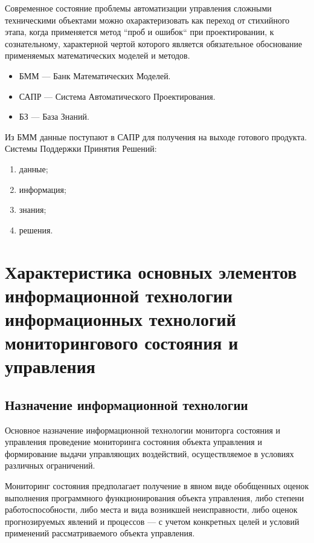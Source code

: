\documentclass[a4paper,12pt]{report}
\begin{document}
	Современное состояние проблемы автоматизации управления сложными техническими
	объектами можно охарактеризовать как переход от стихийного этапа, когда
	применяется метод ``проб и ошибок`` при проектировании, к сознательному,
	характерной чертой которого является обязательное обоснование применяемых
	математических моделей и методов.\\

	\begin{itemize}
		\item БММ — Банк Математических Моделей.
		\item САПР — Система Автоматического Проектирования.
		\item БЗ — База Знаний. \\
	\end{itemize}

	Из БММ данные поступают в САПР для получения на выходе готового продукта.\\

	Системы Поддержки Принятия Решений:
	\begin{enumerate}
		\item данные;
		\item информация;
		\item знания;
		\item решения.
	\end{enumerate}


\section{Характеристика основных элементов информационной технологии
	информационных технологий мониторингового состояния и управления}


\subsection{Назначение информационной технологии}

	Основное назначение информационной технологии мониторга состояния и
	управления проведение мониторинга состояния объекта управления и формирование
	выдачи управляющих воздействий, осуществляемое в условиях различных
	ограничений.

	Мониторинг состояния предполагает получение в явном виде обобщенных оценок
	выполнения программного функционирования объекта управления, либо степени
	работоспособности, либо места и вида возникшей неисправности, либо оценок
	прогнозируемых явлений и процессов — с учетом конкретных целей и условий
	применений рассматриваемого объекта управления.
\end{document}
